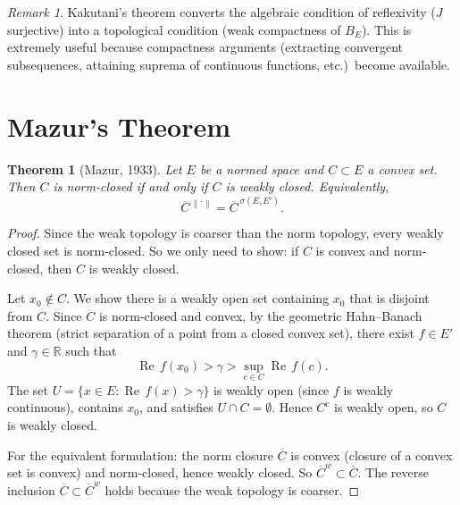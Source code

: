 \documentclass[a4paper,12pt]{book}
\newcommand{\R}{\mathbb{R}}
\newcommand{\norm}[1]{\left\| #1 \right\|}
\theoremstyle{definition}
\theoremstyle{plain}
\newtheorem{theorem}[definition]{Theorem}
\theoremstyle{remark}
\newtheorem{remark}[definition]{Remark}
\begin{document}
\begin{remark}\label{rem:kakutani-significance}
Kakutani's theorem converts the algebraic condition of reflexivity ($J$ surjective)
into a topological condition (weak compactness of $B_E$).  This is extremely
useful because compactness arguments (extracting convergent subsequences,
attaining suprema of continuous functions, etc.)\ become available.
\end{remark}

\section{Mazur's Theorem}\label{sec:mazur}

\begin{theorem}[{Mazur, 1933}]\label{thm:mazur}
Let $E$ be a normed space and $C\subset E$ a convex set.  Then $C$ is
norm-closed if and only if $C$ is weakly closed.  Equivalently,
\[
  \overline{C}^{\,\norm{\cdot}} = \overline{C}^{\,\sigma(E,E')}.
\]
\end{theorem}

\begin{proof}
Since the weak topology is coarser than the norm topology, every weakly closed
set is norm-closed.  So we only need to show: if $C$ is convex and norm-closed,
then $C$ is weakly closed.

Let $x_0\notin C$.  We show there is a weakly open set containing $x_0$ that
is disjoint from $C$.  Since $C$ is norm-closed and convex, by the geometric
Hahn--Banach theorem (strict separation
of a point from a closed convex set), there exist $f\in E'$ and $\gamma\in\R$
such that
\[
  \operatorname{Re}\,f(x_0) > \gamma > \sup_{c\in C}\operatorname{Re}\,f(c).
\]
The set $U = \{x\in E: \operatorname{Re}\,f(x)>\gamma\}$ is weakly open (since $f$ is
weakly continuous), contains $x_0$, and satisfies $U\cap C = \emptyset$.
Hence $C^c$ is weakly open, so $C$ is weakly closed.

For the equivalent formulation: the norm closure $\overline{C}$ is convex
(closure of a convex set is convex) and norm-closed, hence weakly closed.
So $\overline{C}^{w}\subset\overline{C}$.  The reverse inclusion
$\overline{C}\subset\overline{C}^{w}$ holds because the weak topology is
coarser.
\end{proof}
\end{document}
